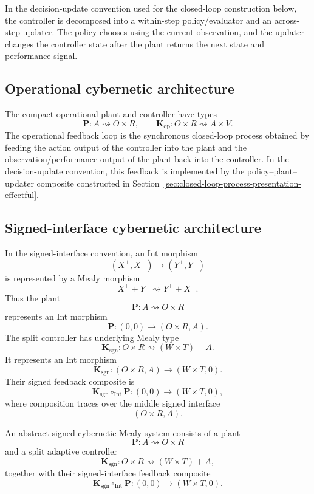 In the decision-update convention used for the closed-loop construction below, the controller is
decomposed into a within-step policy/evaluator and an across-step updater.  The policy chooses
using the current observation, and the updater changes the controller state after the plant returns
the next state and performance signal.

\subsection{Operational cybernetic architecture}
\label{subsec:operational-cybernetic-architecture}

The compact operational plant and controller have types
\[
\mathbf P:A\rightsquigarrow O\times R,
\qquad
\mathbf K_{\mathrm{op}}:O\times R\rightsquigarrow A\times V.
\]
The operational feedback loop is the synchronous closed-loop process obtained by feeding the action
output of the controller into the plant and the observation/performance output of the plant back
into the controller.  In the decision-update convention, this feedback is implemented by the
policy--plant--updater composite constructed in
Section~\ref{sec:closed-loop-process-presentation-effectful}.

\subsection{Signed-interface cybernetic architecture}
\label{subsec:signed-interface-cybernetic-architecture}

In the signed-interface convention, an Int morphism
\[
(X^+,X^-)\to(Y^+,Y^-)
\]
is represented by a Mealy morphism
\[
X^+ + Y^-\rightsquigarrow Y^+ + X^- .
\]
Thus the plant
\[
\mathbf P:A\rightsquigarrow O\times R
\]
represents an Int morphism
\[
\mathbf P:(0,0)\to(O\times R,A).
\]
The split controller has underlying Mealy type
\[
\mathbf K_{\mathrm{sgn}}:O\times R\rightsquigarrow (W\times T)+A.
\]
It represents an Int morphism
\[
\mathbf K_{\mathrm{sgn}}:(O\times R,A)\to(W\times T,0).
\]
Their signed feedback composite is
\[
\mathbf K_{\mathrm{sgn}}\circ_{\mathrm{Int}}\mathbf P:(0,0)\to(W\times T,0),
\]
where composition traces over the middle signed interface
\[
(O\times R,A).
\]

\begin{definition}
\label{def:abstract-signed-cybernetic-mealy-system}
An abstract signed cybernetic Mealy system consists of a plant
\[
\mathbf P:A\rightsquigarrow O\times R
\]
and a split adaptive controller
\[
\mathbf K_{\mathrm{sgn}}:O\times R\rightsquigarrow (W\times T)+A,
\]
together with their signed-interface feedback composite
\[
\mathbf K_{\mathrm{sgn}}\circ_{\mathrm{Int}}\mathbf P:(0,0)\to(W\times T,0).
\]
\end{definition}

